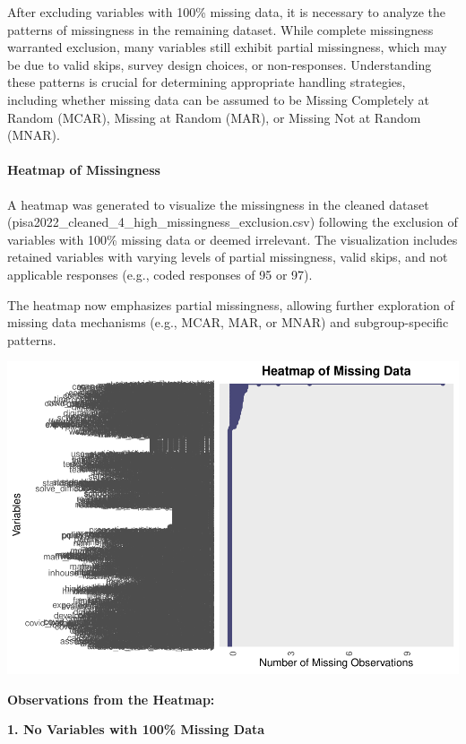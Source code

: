 \documentclass[
]{article}
\begin{document}
After excluding variables with 100\% missing data, it is necessary to
analyze the patterns of missingness in the remaining dataset. While
complete missingness warranted exclusion, many variables still exhibit
partial missingness, which may be due to valid skips, survey design
choices, or non-responses. Understanding these patterns is crucial for
determining appropriate handling strategies, including whether missing
data can be assumed to be Missing Completely at Random (MCAR), Missing
at Random (MAR), or Missing Not at Random (MNAR).

\hypertarget{heatmap-of-missingness}{%
\paragraph{Heatmap of Missingness}\label{heatmap-of-missingness}}

A heatmap was generated to visualize the missingness in the cleaned
dataset (pisa2022\_cleaned\_4\_high\_missingness\_exclusion.csv)
following the exclusion of variables with 100\% missing data or deemed
irrelevant. The visualization includes retained variables with varying
levels of partial missingness, valid skips, and not applicable responses
(e.g., coded responses of 95 or 97).

The heatmap now emphasizes partial missingness, allowing further
exploration of missing data mechanisms (e.g., MCAR, MAR, or MNAR) and
subgroup-specific patterns.

\includegraphics{PhD_Data_Analysis_files/figure-latex/missing_data_heatmap-1.pdf}

\textbf{Observations from the Heatmap:}

\textbf{1. No Variables with 100\% Missing Data}
\end{document}
